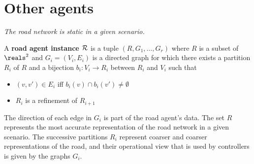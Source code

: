 \section{Other agents}
\label{otherAgents}

{\it The road network is static in a given scenario.}
\begin{defn}
	\label{def:road}
	A \textbf{road agent instance $\mathcal{R}$} is a tuple $(R, G_1,\ldots, G_r)$ where 
	$R$ is a subset of $\reals^2$
	and $G_i = (V_i,E_i)$ is a directed graph for which there exists a partition $R_i$ of $R$ and a bijection $b_i: V_i \rightarrow R_i$ between $R_i$ and $V_i$ such that
	\begin{itemize}
		\item  $(v,v') \in E_i$ iff $b_i(v)\cap b_i(v') \neq \emptyset$
		\item $R_i$ is a refinement of $R_{i+1}$
	\end{itemize}
	\end{defn}

The direction of each edge in $G_i$ is part of the road agent's data.
The set $R$ represents the most accurate representation of the road network in a given scenario.
The successive partitions $R_i$ represent coarser and coarser representations of the road, and their operational view that is used by controllers is given by the graphs $G_i$.

